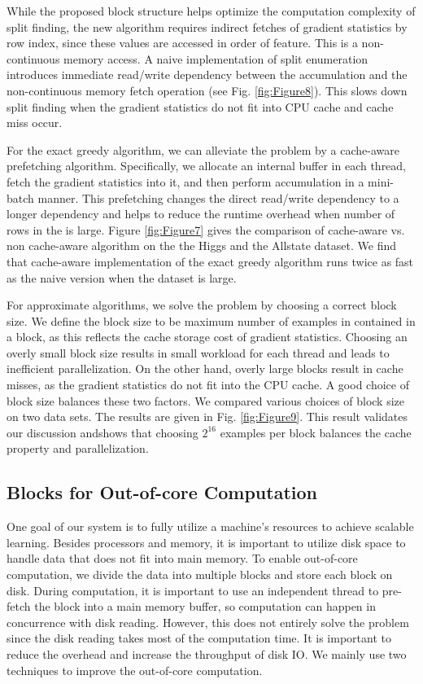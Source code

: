 \documentclass[sigconf]{acmart}
\begin{document}
While the proposed block structure helps optimize the computation complexity of split finding, the new algorithm
requires indirect fetches of gradient statistics by row index, since these values are accessed in order of feature. This is
a non-continuous memory access. A naive implementation of split enumeration introduces immediate read/write dependency 
between the accumulation and the non-continuous memory fetch operation (see Fig. \ref{fig:Figure8}). This slows down split
finding when the gradient statistics do not fit into CPU cache and cache miss occur.

For the exact greedy algorithm, we can alleviate the problem by a cache-aware prefetching algorithm. Specifically,
we allocate an internal buffer in each thread, fetch the gradient statistics into it, and then perform accumulation in
a mini-batch manner. This prefetching changes the direct read/write dependency to a longer dependency and helps to
reduce the runtime overhead when number of rows in the is large. Figure \ref{fig:Figure7} gives the comparison of cache-aware 
vs. non cache-aware algorithm on the the Higgs and the Allstate dataset. We find that cache-aware implementation of
the exact greedy algorithm runs twice as fast as the naive version when the dataset is large.

For approximate algorithms, we solve the problem by choosing a correct block size. We define the block size to be maximum
number of examples in contained in a block, as this reflects the cache storage cost of gradient statistics. 
Choosing an overly small block size results in small workload for each thread and leads to inefficient parallelization. On the
other hand, overly large blocks result in cache misses, as the gradient statistics do not fit into the CPU cache. A good
choice of block size balances these two factors. We compared various choices of block size on two data sets. The results
are given in Fig. \ref{fig:Figure9}. This result validates our discussion andshows that choosing $2^{16}$ examples per block balances the
cache property and parallelization.

\subsection{Blocks for Out-of-core Computation}
\label{subsec:Blocks for Out-of-core Computation}
One goal of our system is to fully utilize a machine’s resources to achieve scalable learning. Besides processors and
memory, it is important to utilize disk space to handle data that does not fit into main memory. To enable out-of-core
computation, we divide the data into multiple blocks and store each block on disk. During computation, it is important 
to use an independent thread to pre-fetch the block into a main memory buffer, so computation can happen in concurrence 
with disk reading. However, this does not entirely solve the problem since the disk reading takes most of the
computation time. It is important to reduce the overhead and increase the throughput of disk IO. We mainly use two
techniques to improve the out-of-core computation.
\end{document}
